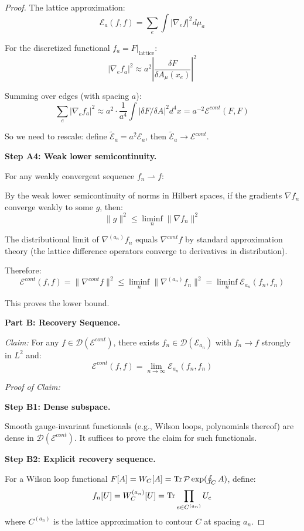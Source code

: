 \begin{proof}
The lattice approximation:
\[
\mathcal{E}_a(f, f) = \sum_{e} \int |\nabla_e f|^2 d\mu_a
\]

For the discretized functional $f_a = F|_{\text{lattice}}$:
\[
|\nabla_e f_a|^2 \approx a^2 \left|\frac{\delta F}{\delta A_\mu(x_e)}\right|^2
\]

Summing over edges (with spacing $a$):
\[
\sum_e |\nabla_e f_a|^2 \approx a^2 \cdot \frac{1}{a^4} \int |\delta F/\delta A|^2 d^4x 
= a^{-2} \mathcal{E}^{cont}(F, F)
\]

So we need to rescale: define $\tilde{\mathcal{E}}_a = a^2 \mathcal{E}_a$, then 
$\tilde{\mathcal{E}}_a \to \mathcal{E}^{cont}$.

\textbf{Step A4: Weak lower semicontinuity.}

For any weakly convergent sequence $f_n \rightharpoonup f$:

By the weak lower semicontinuity of norms in Hilbert spaces, if the gradients 
$\nabla f_n$ converge weakly to some $g$, then:
\[
\|g\|^2 \leq \liminf_n \|\nabla f_n\|^2
\]

The distributional limit of $\nabla^{(a_n)} f_n$ equals $\nabla^{cont} f$ by 
standard approximation theory (the lattice difference operators converge to 
derivatives in distribution).

Therefore:
\[
\mathcal{E}^{cont}(f, f) = \|\nabla^{cont} f\|^2 \leq \liminf_n \|\nabla^{(a_n)} f_n\|^2 
= \liminf_n \mathcal{E}_{a_n}(f_n, f_n)
\]

This proves the lower bound.

\textbf{Part B: Recovery Sequence.}

\textit{Claim:} For any $f \in \mathcal{D}(\mathcal{E}^{cont})$, there exists 
$f_n \in \mathcal{D}(\mathcal{E}_{a_n})$ with $f_n \to f$ strongly in $L^2$ and:
\[
\mathcal{E}^{cont}(f, f) = \lim_{n \to \infty} \mathcal{E}_{a_n}(f_n, f_n)
\]

\textit{Proof of Claim:}

\textbf{Step B1: Dense subspace.}

Smooth gauge-invariant functionals (e.g., Wilson loops, polynomials thereof) 
are dense in $\mathcal{D}(\mathcal{E}^{cont})$. It suffices to prove the claim 
for such functionals.

\textbf{Step B2: Explicit recovery sequence.}

For a Wilson loop functional $F[A] = W_C[A] = \operatorname{Tr}\mathcal{P}\exp(\oint_C A)$, 
define:
\[
f_n[U] = W_C^{(a_n)}[U] = \operatorname{Tr} \prod_{e \in C^{(a_n)}} U_e
\]
where $C^{(a_n)}$ is the lattice approximation to contour $C$ at spacing $a_n$.


\end{proof}
